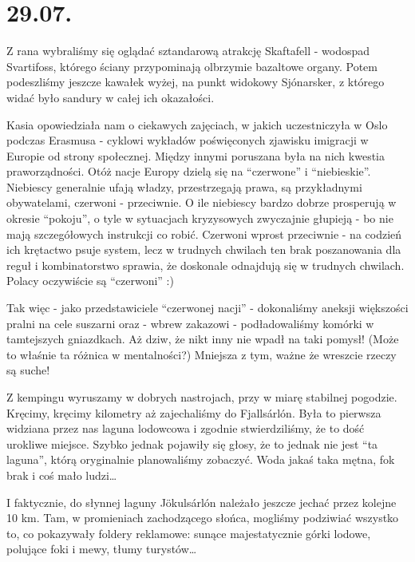 \chapter*{29.07.}

Z rana wybraliśmy się oglądać sztandarową atrakcję Skaftafell - wodospad Svartifoss, którego ściany przypominają olbrzymie bazaltowe organy. Potem podeszliśmy jeszcze kawałek wyżej, na punkt widokowy Sjónarsker, z którego widać było sandury w całej ich okazałości.

Kasia opowiedziała nam o ciekawych zajęciach, w jakich uczestniczyła w Oslo podczas Erasmusa - cyklowi wykładów poświęconych zjawisku imigracji w Europie od strony społecznej. Między innymi poruszana była na nich kwestia praworządności. Otóż nacje Europy dzielą się na “czerwone” i “niebieskie”. Niebiescy generalnie ufają władzy, przestrzegają prawa, są przykładnymi obywatelami, czerwoni - przeciwnie. O ile niebiescy bardzo dobrze prosperują w okresie “pokoju”, o tyle w sytuacjach kryzysowych zwyczajnie głupieją - bo nie mają szczegółowych instrukcji co robić. Czerwoni wprost przeciwnie - na codzień ich krętactwo psuje system, lecz w trudnych chwilach ten brak poszanowania dla reguł i kombinatorstwo sprawia, że doskonale odnajdują się w trudnych chwilach. Polacy oczywiście są “czerwoni” :)

Tak więc - jako przedstawiciele “czerwonej nacji” - dokonaliśmy aneksji większości pralni na cele suszarni oraz - wbrew zakazowi - podładowaliśmy komórki w tamtejszych gniazdkach. Aż dziw, że nikt inny nie wpadł na taki pomysł! (Może to właśnie ta różnica w mentalności?) Mniejsza z tym, ważne że wreszcie rzeczy są suche!


Z kempingu wyruszamy w dobrych nastrojach, przy w miarę stabilnej pogodzie. Kręcimy, kręcimy kilometry aż zajechaliśmy do Fjallsárlón. Była to pierwsza widziana przez nas laguna lodowcowa i zgodnie stwierdziliśmy, że to dość urokliwe miejsce. Szybko jednak pojawiły się głosy, że to jednak nie jest “ta laguna”, którą oryginalnie planowaliśmy zobaczyć. Woda jakaś taka mętna, fok brak i coś mało ludzi…


I faktycznie, do słynnej laguny Jökulsárlón należało jeszcze jechać przez kolejne 10 km. Tam, w promieniach zachodzącego słońca, mogliśmy podziwiać wszystko to, co pokazywały foldery reklamowe: sunące majestatycznie górki lodowe, polujące foki i mewy, tłumy turystów…

